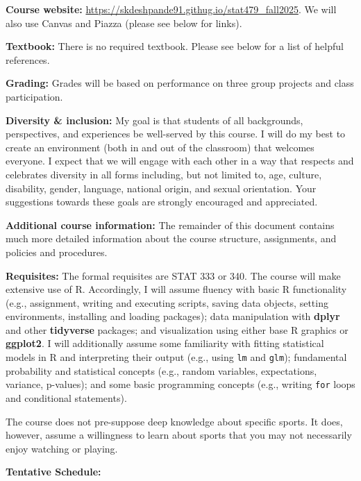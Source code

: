 \documentclass[11pt]{article}
\begin{document}
\textbf{Course website:} \url{https://skdeshpande91.githug.io/stat479_fall2025}. We will also use Canvas and Piazza (please see below for links).

\textbf{Textbook:} There is no required textbook. Please see below for a list of helpful references.

\textbf{Grading:} Grades will be based on performance on three group projects and class participation.

\textbf{Diversity \& inclusion:} My goal is that students of all backgrounds, perspectives, and experiences be well-served by this course. I will do my best to create an environment (both in and out of the classroom) that welcomes everyone. 
I expect that we will engage with each other in a way that respects and celebrates diversity in all forms including, but not limited to, age, culture, disability, gender, language, national origin, and sexual orientation. 
Your suggestions towards these goals are strongly encouraged and appreciated.

\textbf{Additional course information:} The remainder of this document contains much more detailed information about the course structure, assignments, and policies and procedures.

\newpage

\textbf{Requisites:} The formal requisites are STAT 333 or 340. 
The course will make extensive use of \textsf{R}. 
Accordingly, I will assume fluency with basic \textsf{R} functionality (e.g., assignment, writing and executing scripts, saving data objects, setting environments, installing and loading packages); data manipulation with \textbf{dplyr} and other \textbf{tidyverse} packages; and visualization using either base \textsf{R} graphics or \textbf{ggplot2}.
I will additionally assume some familiarity with fitting statistical models in \textsf{R} and interpreting their output (e.g., using \texttt{lm} and \texttt{glm}); fundamental probability and statistical concepts (e.g., random variables, expectations, variance, p-values); and some basic programming concepts (e.g., writing \texttt{for} loops and conditional statements).

The course does not pre-suppose deep knowledge about specific sports. 
It does, however, assume a willingness to learn about sports that you may not necessarily enjoy watching or playing.

\textbf{Tentative Schedule:}
\end{document}

